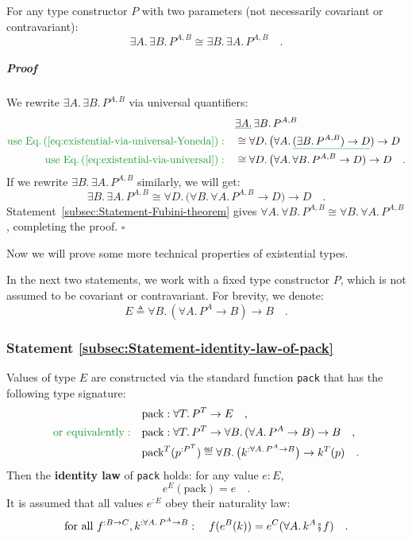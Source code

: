 For any type constructor $P$ with two parameters (not necessarily
covariant or contravariant):
\[
\exists A.\,\exists B.\,P^{A,B}\cong\exists B.\,\exists A.\,P^{A,B}\quad.
\]


\subparagraph{Proof}

We rewrite $\exists A.\,\exists B.\,P^{A,B}$ via universal quantifiers:
\begin{align*}
 & \gunderline{\exists A.}\,\exists B.\,P^{A,B}\\
{\color{greenunder}\text{use Eq.\,(\ref{eq:existential-via-universal-Yoneda})}:}\quad & \cong\forall D.\,\big(\forall A.\,\gunderline{(\exists B.\,P^{A,B})\rightarrow D})\rightarrow D\\
{\color{greenunder}\text{use Eq.\,(\ref{eq:existential-via-universal})}:}\quad & \cong\forall D.\,\big(\forall A.\,\forall B.\,P^{A,B}\rightarrow D)\rightarrow D\quad.
\end{align*}
If we rewrite $\exists B.\,\exists A.\,P^{A,B}$ similarly, we will
get:
\[
\exists B.\,\exists A.\,P^{A,B}\cong\forall D.\,\big(\forall B.\,\forall A.\,P^{A,B}\rightarrow D)\rightarrow D\quad.
\]
Statement~\ref{subsec:Statement-Fubini-theorem} gives $\forall A.\,\forall B.\,P^{A,B}\cong\forall B.\,\forall A.\,P^{A,B}$,
completing the proof. $\square$

Now we will prove some more technical properties of existential types.

In the next two statements, we work with a fixed type constructor
$P$, which is not assumed to be covariant or contravariant. For brevity,
we denote:
\[
E\triangleq\forall B.\,(\forall A.\,P^{A}\rightarrow B)\rightarrow B\quad.
\]


\subsubsection{Statement \label{subsec:Statement-identity-law-of-pack}\ref{subsec:Statement-identity-law-of-pack}}

Values of type $E$ are constructed via the standard function \lstinline!pack!
that has the following type signature:
\begin{align*}
 & \text{pack}:\forall T.\,P^{T}\rightarrow E\quad,\\
{\color{greenunder}\text{or equivalently}:}\quad & \text{pack}:\forall T.\,P^{T}\rightarrow\forall B.\,(\forall A.\,P^{A}\rightarrow B)\rightarrow B\quad,\\
 & \text{pack}^{T}(p^{:P^{T}})\triangleq\forall B.\,\big(k^{:\forall A.\,P^{A}\rightarrow B}\big)\rightarrow k^{T}(p)\quad.
\end{align*}
Then the \textbf{identity law} of
\lstinline!pack! holds: for any value $e:E$, 
\begin{equation}
e^{E}(\text{pack})=e\quad.\label{eq:identity-law-of-pack}
\end{equation}
It is assumed that all values $e^{:E}$ obey their naturality law:
\begin{equation}
\text{for all }f^{:B\rightarrow C},k^{:\forall A.\,P^{A}\rightarrow B}:\quad f(e^{B}(k))=e^{C}(\forall A.\,k^{A}\bef f)\quad.\label{eq:naturality-law-of-e-derivation1}
\end{equation}


